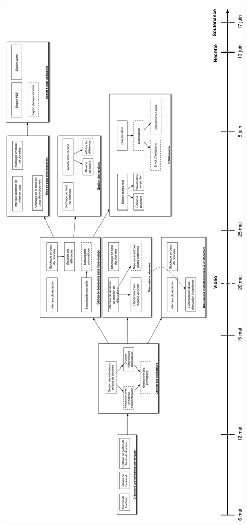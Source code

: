 \documentclass[10pt,twocolumn,a4paper,utf8x]{article}
\begin{document}
\includegraphics[width=\linewidth,height=\textheight,keepaspectratio]{pert.png} 
\end{document}
